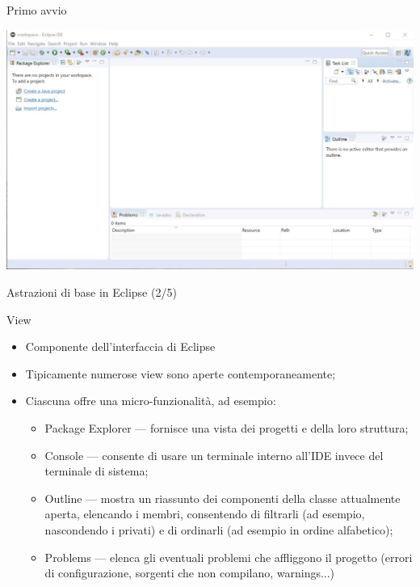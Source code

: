 \documentclass[xcolor=dvipsnames,presentation]{beamer}
\begin{document}
\begin{frame}{Primo avvio}
\begin{center}
\includegraphics[width=\textwidth]{img/eclipse-screenshots/eclipse-ide-01.jpg}
\end{center}
\end{frame}

\begin{frame}{Astrazioni di base in Eclipse (2/5)}
\begin{block}{View}
\begin{itemize}
\item Componente dell'interfaccia di Eclipse
\item Tipicamente numerose view sono aperte contemporaneamente;
\item Ciascuna offre una micro-funzionalità, ad esempio:
\begin{itemize}
\item Package Explorer --- fornisce una vista dei progetti e della loro struttura;
\item Console --- consente di usare un terminale interno all'IDE invece del terminale di sistema;
\item Outline --- mostra un riassunto dei componenti della classe attualmente aperta, elencando i membri, consentendo di filtrarli (ad esempio, nascondendo i privati) e di ordinarli (ad esempio in ordine alfabetico);
\item Problems --- elenca gli eventuali problemi che affliggono il progetto (errori di configurazione, sorgenti che non compilano, warnings...)
\end{itemize}
\end{itemize}
\end{block}
\end{frame}
\end{document}
